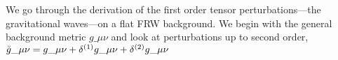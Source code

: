 



\newcommand{\pert}[1]{\accentset{\circ}{#1}}



We go through the derivation of the first order tensor perturbations---the gravitational waves---on a flat FRW background. We begin with the general background metric $g\_{\mu\nu}$ and look at perturbations up to second order, $\pert{g}\_{\mu\nu}=g\_{\mu\nu} + \delta^{(1)}g\_{\mu\nu}+\delta^{(2)}g\_{\mu\nu}$ 

\citep{jokelaGravitationalWaveMemory2022}